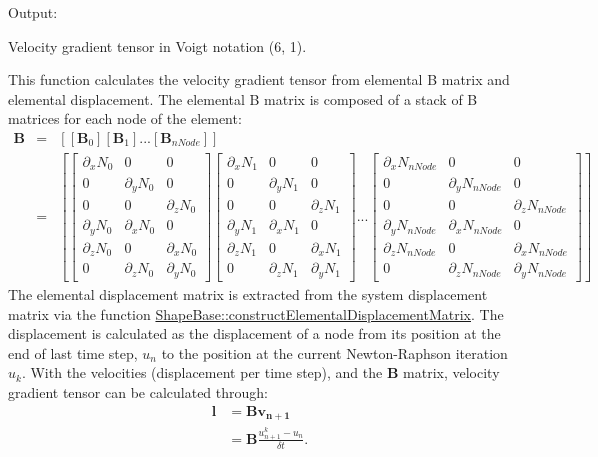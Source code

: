 Output\+:
\begin{DoxyEnumerate}
\item Velocity gradient tensor in Voigt notation (6, 1).
\end{DoxyEnumerate}

This function calculates the velocity gradient tensor from elemental B matrix and elemental displacement. The elemental B matrix is composed of a stack of B matrices for each node of the element\+: \begin{eqnarray*} \textbf{B} &=& \left[ \left[ \textbf{B}_{0} \right] \left[ \textbf{B}_{1} \right] ... \left[ \textbf{B}_{nNode}\right] \right]\\ &=& \left[ \begin{bmatrix} \partial_x N_0 & 0 & 0 \\ 0 & \partial_y N_0 & 0 \\ 0 & 0 & \partial_z N_0 \\ \partial_y N_0 & \partial_x N_0 & 0\\ \partial_z N_0 & 0 & \partial_x N_0 \\ 0 & \partial_z N_0 & \partial_y N_0 \end{bmatrix} \begin{bmatrix} \partial_x N_1 & 0 & 0 \\ 0 & \partial_y N_1 & 0 \\ 0 & 0 & \partial_z N_1 \\ \partial_y N_1 & \partial_x N_1 & 0\\ \partial_z N_1 & 0 & \partial_x N_1 \\ 0 & \partial_z N_1 & \partial_y N_1 \end{bmatrix} ... \begin{bmatrix} \partial_x N_{nNode} & 0 & 0 \\ 0 & \partial_y N_{nNode} & 0 \\ 0 & 0 & \partial_z N_{nNode} \\ \partial_y N_{nNode} & \partial_x N_{nNode} & 0\\ \partial_z N_{nNode} & 0 & \partial_x N_{nNode} \\ 0 & \partial_z N_{nNode} & \partial_y N_{nNode} \end{bmatrix} \right] \end{eqnarray*} The elemental displacement matrix is extracted from the system displacement matrix via the function \hyperlink{classShapeBase_afcdbbe37a746ade52a1af70a9aa12b9f}{Shape\+Base\+::construct\+Elemental\+Displacement\+Matrix}. The displacement is calculated as the displacement of a node from its position at the end of last time step, $ u_{n}$ to the position at the current Newton-\/\+Raphson iteration $ u_{k}$. With the velocities (displacement per time step), and the $\textbf{B}$ matrix, velocity gradient tensor can be calculated through\+: \begin{eqnarray*} \boldsymbol{l} & = \boldsymbol{B} \boldsymbol{v_{n+1}}\nonumber \\ & = \boldsymbol{B} \frac{{u_{n+1}^{k} - u_{n}}} {\delta t}. \end{eqnarray*}

